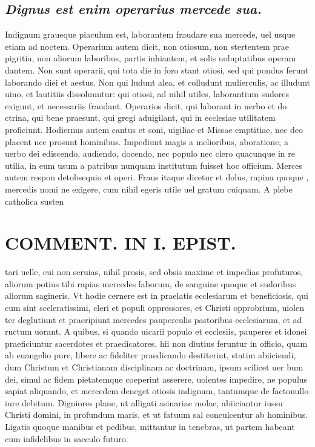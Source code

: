 \documentclass{article}
\begin{document}
\begin{pages}
\subsection*{\textit{Dignus est enim operarius mercede sua. }}\pstart Indignum graueque piaculum est, laborantem fraudare sua mercede, uel usque  etiam ad noctem. Operarium autem dicit, non otiosum, non stertentem prae pigritia, non aliorum laboribus, partis inhiantem, et solis uoluptatibus operam dantem. Non sunt operarii, qui tota die in foro stant otiosi, sed qui pondus ferunt laborando diei et aestus. Non qui ludunt alea, et colludunt mulierculis, ac illudunt uino, et lautitiis dissoluuntur: qui otiosi, ad nihil utiles, laborantium sudores exigunt, et necessariis fraudant. Operarios dicit, qui laborant in uerbo et do ctrina, qui bene praesunt, qui gregi aduigilant, qui in ecclesiae utilitatem proficiunt. Hodiernus autem cantus et soni, uigiliae et Missae emptitiae, nec deo placent nec prosunt hominibus. Impediunt magis a melioribus, aboratione, a uerbo dei ediscendo, audiendo, docendo, nec populo nec clero quacunque in re utilia, in eum usum a patribus nunquam institutum fuisset hoc officium. Merces autem respon detobsequio et operi. Fraus itaque dicetur et dolus, rapina quoque , mercedis nomi ne exigere, cum nihil egeris utile uel gratum cuiquam. A plebe catholica susten\pend
\section*{COMMENT. IN I. EPIST. }
\marginpar{[ p.524 ]}\pstart tari uelle, cui non seruias, nihil prosis, sed obsis maxime et impedias profuturos, aliorum potius tibi rapias mercedes laborum, de sanguine quoque et sudoribus aliorum sagineris. Vt hodie cernere est in praelatis ecclesiarum et beneficiosis, qui cum sint sceleratissimi, cleri et populi oppressores, et Christi opprobrium, uiolen ter deglutiunt et praeripiunt mercedes pauperculis pastoribus ecclesiarum, et ad ructum uorant. A quibus, si quando uicarii populo et ecclesiis, pauperes et idonei praeficiuntur sacerdotes et praedicatores, hii non diutius feruntur in officio, quam ab euangelio pure, libere ac fideliter praedicando destiterint, statim abiiciendi, dum Christum et Christianam disciplinam ac doctrinam, ipsum scilicet uer bum dei, simul ac fidem pietatemque coeperint asserere, uolentes impedire, ne populus sapiat aliquando, et mercedem deneget otiosis indignum, tantumque de factonullo iure debitum. Digniores plane, ut alligati asinariae molae, abiiciantur iussu Christi domini, in profundum maris, et ut fatuum sal conculcentur ab hominibus. Ligatis quoque manibus et pedibus, mittantur in tenebras, ut partem habeant cum infidelibus in saeculo futuro.  \pend
{}
{}

\end{pages}
\end{document}
